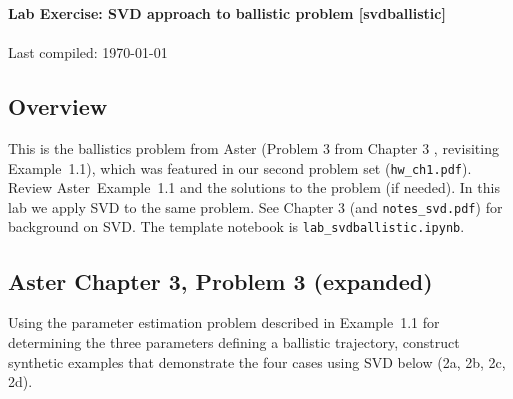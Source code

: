 \documentclass[11pt,titlepage,fleqn]{article}
\newcommand{\tfile}{{\tt lab\_svdballistic.ipynb}}
\newcommand{\nfile}{{\tt notes\_svd.pdf}}
\begin{document}

\begin{spacing}{1.2}
\centering
{\large \bf Lab Exercise: SVD approach to ballistic problem [svdballistic]} \\
\cltag\ \\
Last compiled: \today
\end{spacing}


\subsection*{Overview}

This is the ballistics problem from Aster (Problem 3 from Chapter 3 \citep{Aster}, revisiting Example~1.1), which was featured in our second problem set (\verb+hw_ch1.pdf+). Review Aster~Example~1.1 and the solutions to the problem (if needed). In this lab we apply SVD to the same problem. See Chapter 3 (and \nfile) for background on SVD. The template notebook is \tfile.


\subsection*{Aster Chapter 3, Problem 3 (expanded)}

Using the parameter estimation problem described in Example~1.1 for determining the three parameters defining a ballistic trajectory, construct synthetic examples that demonstrate the four cases using SVD below (2a, 2b, 2c, 2d).
\end{document}

